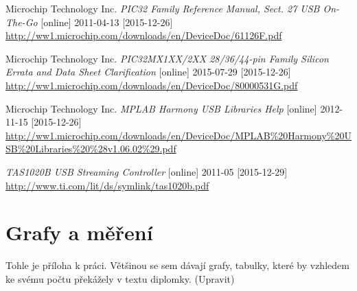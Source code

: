 \documentclass[bc,male,c,dept460]{diploma}						%
\begin{document}
\begin{thebibliography}{99}
 Microchip Technology Inc.
\textit{PIC32 Family Reference Manual, Sect. 27 USB On-The-Go} [online] 2011-04-13 [2015-12-26]
\url{http://ww1.microchip.com/downloads/en/DeviceDoc/61126F.pdf}

 Microchip Technology Inc.
\textit{PIC32MX1XX/2XX 28/36/44-pin Family Silicon Errata and Data Sheet Clarification} [online] 2015-07-29 [2015-12-26]
\url{http://ww1.microchip.com/downloads/en/DeviceDoc/80000531G.pdf}

 Microchip Technology Inc.
\textit{MPLAB Harmony USB Libraries Help} [online] 2012-11-15 [2015-12-26]
\url{http://ww1.microchip.com/downloads/en/DeviceDoc/MPLAB\%20Harmony\%20USB\%20Libraries\%20\%28v1.06.02\%29.pdf}

\textit{TAS1020B USB Streaming Controller} [online] 2011-05 [2015-12-29]
\url{http://www.ti.com/lit/ds/symlink/tas1020b.pdf} 
\end{thebibliography}


\appendix
\section{Grafy a měření}
Tohle je příloha k práci. Většinou se sem dávají grafy, tabulky, které by vzhledem
ke svému počtu překážely v textu diplomky. (Upravit)
\clearpage

\end{document}
